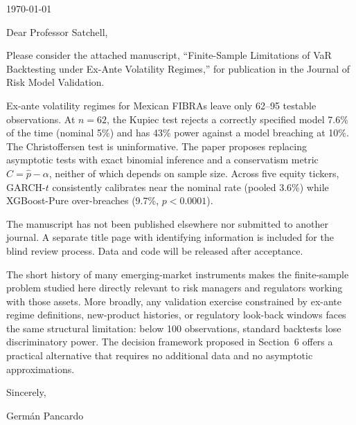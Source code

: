 \documentclass[12pt,a4paper]{article}
\begin{document}
\begin{flushright}
\today
\end{flushright}

\vspace{1cm}

\noindent Dear Professor Satchell,

\vspace{0.5cm}

Please consider the attached manuscript, ``Finite-Sample Limitations of VaR Backtesting under Ex-Ante Volatility Regimes,'' for publication in the Journal of Risk Model Validation.

Ex-ante volatility regimes for Mexican FIBRAs leave only 62--95 testable observations. At $n = 62$, the Kupiec test rejects a correctly specified model 7.6\% of the time (nominal 5\%) and has 43\% power against a model breaching at 10\%. The Christoffersen test is uninformative. The paper proposes replacing asymptotic tests with exact binomial inference and a conservatism metric $C = \hat{p} - \alpha$, neither of which depends on sample size. Across five equity tickers, GARCH-$t$ consistently calibrates near the nominal rate (pooled 3.6\%) while XGBoost-Pure over-breaches (9.7\%, $p < 0.0001$).

The manuscript has not been published elsewhere nor submitted to another journal. A separate title page with identifying information is included for the blind review process. Data and code will be released after acceptance.

The short history of many emerging-market instruments makes the finite-sample problem studied here directly relevant to risk managers and regulators working with those assets. More broadly, any validation exercise constrained by ex-ante regime definitions, new-product histories, or regulatory look-back windows faces the same structural limitation: below 100 observations, standard backtests lose discriminatory power. The decision framework proposed in Section~6 offers a practical alternative that requires no additional data and no asymptotic approximations.

\vspace{0.5cm}

\noindent Sincerely,

\vspace{1cm}

\noindent Germ\'an Pancardo
\end{document}
